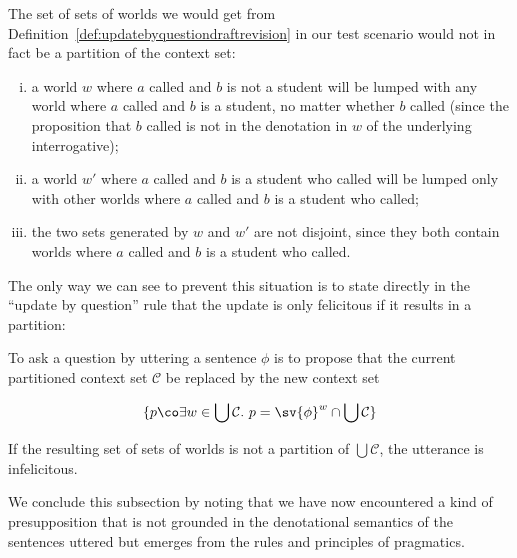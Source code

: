 The set of sets of worlds we would get from
Definition~\ref{def:updatebyquestiondraftrevision} in our test scenario would
not in fact be a partition of the context set:

\begin{enumerate}[(i)]
  \item a world $w$ where $a$ called and $b$ is not a student will be lumped
        with any world where $a$ called and $b$ is a student, no matter whether
        $b$ called (since the proposition that $b$ called is not in the
        denotation in $w$ of the underlying interrogative);
  \item a world $w'$ where $a$ called and $b$ is a student who called will be
        lumped only with other worlds where $a$ called and $b$ is a student who
        called;
  \item the two sets generated by $w$ and $w'$ are not disjoint, since they both
        contain worlds where $a$ called and $b$ is a student who called.
\end{enumerate}

The only way we can see to prevent this situation is to state directly in the
``update by question'' rule that the update is only felicitous if it results in
a partition:

\begin{definition}\label{def:updatebyquestionfinalrevision}%
  To ask a question by uttering a sentence $\phi$ is to propose that the current
  partitioned context set $\mathcal{C}$ be replaced by the new context set

  \[\{p\co \exists w\in\bigcup\mathcal{C}.\ p = \sv{\phi}^{w}\cap \bigcup\mathcal{C}\}\]

  If the resulting set of sets of worlds is not a partition of
  $\bigcup\mathcal{C}$, the utterance is infelicitous.
\end{definition}

%
We conclude this subsection by noting that we have now encountered a kind of
presupposition that is not grounded in the denotational semantics of the
sentences uttered but emerges from the rules and principles of pragmatics.

